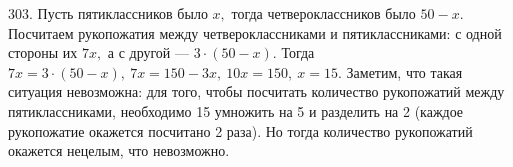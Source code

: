 303. Пусть пятиклассников было $x,$ тогда четвероклассников было  $50-x.$ Посчитаем рукопожатия между четвероклассниками и пятиклассниками: с одной стороны их $7x,$ а с другой --- $3\cdot(50-x).$ Тогда $7x=3\cdot(50-x),\
7x=150-3x,\ 10x=150,\ x=15.$ Заметим, что такая ситуация невозможна: для того, чтобы посчитать количество рукопожатий между пятиклассниками, необходимо 15 умножить на 5 и разделить на 2 (каждое рукопожатие окажется посчитано 2 раза). Но тогда количество рукопожатий окажется нецелым, что невозможно.\\
